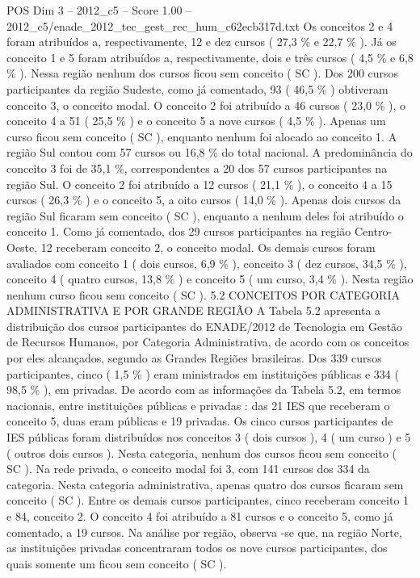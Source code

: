\begin{textsample}{POS Dim 3 – 2012\_c5 – Score 1.00 – 2012\_c5/enade\_2012\_tec\_gest\_rec\_hum\_c62ecb317d.txt}
Os conceitos 2 e 4 foram atribuídos a, respectivamente, 12 e dez cursos ( 27,3 \% e 22,7 \% ).
Já os conceito 1 e 5 foram atribuídos a, respectivamente, dois e três cursos ( 4,5 \% e 6,8 \% ).
Nessa região nenhum dos cursos ficou sem conceito ( SC ).
Dos 200 cursos participantes da região Sudeste, como já comentado, 93 ( 46,5 \% ) obtiveram conceito 3, o conceito modal.
O conceito 2 foi atribuído a 46 cursos ( 23,0 \% ), o conceito 4 a 51 ( 25,5 \% ) e o conceito 5 a nove cursos ( 4,5 \% ).
Apenas um curso ficou sem conceito ( SC ), enquanto nenhum foi alocado ao conceito 1.
A região Sul contou com 57 cursos ou 16,8 \% do total nacional.
A predominância do conceito 3 foi de 35,1 \%, correspondentes a 20 dos 57 cursos participantes na região Sul.
O conceito 2 foi atribuído a 12 cursos ( 21,1 \% ), o conceito 4 a 15 cursos ( 26,3 \% ) e o conceito 5, a oito cursos ( 14,0 \% ).
Apenas dois cursos da região Sul ficaram sem conceito ( SC ), enquanto a nenhum deles foi atribuído o conceito 1.
Como já comentado, dos 29 cursos participantes na região Centro-Oeste, 12 receberam conceito 2, o conceito modal.
Os demais cursos foram avaliados com conceito 1 ( dois cursos, 6,9 \% ), conceito 3 ( dez cursos, 34,5 \% ), conceito 4 ( quatro cursos, 13,8 \% ) e conceito 5 ( um curso, 3,4 \% ).
Nesta região nenhum curso ficou sem conceito ( SC ). 5.2 CONCEITOS POR CATEGORIA ADMINISTRATIVA E POR GRANDE REGIÃO A Tabela 5.2 apresenta a distribuição dos cursos participantes do ENADE/2012 de Tecnologia em Gestão de Recursos Humanos, por Categoria Administrativa, de acordo com os conceitos por eles alcançados, segundo as Grandes Regiões brasileiras.
Dos 339 cursos participantes, cinco ( 1,5 \% ) eram ministrados em instituições públicas e 334 ( 98,5 \% ), em privadas.
De acordo com as informações da Tabela 5.2, em termos nacionais, entre instituições públicas e privadas : das 21 IES que receberam o conceito 5, duas eram públicas e 19 privadas.
Os cinco cursos participantes de IES públicas foram distribuídos nos conceitos 3 ( dois cursos ), 4 ( um curso ) e 5 ( outros dois cursos ).
Nesta categoria, nenhum dos cursos ficou sem conceito ( SC ).
Na rede privada, o conceito modal foi 3, com 141 cursos dos 334 da categoria.
Nesta categoria administrativa, apenas quatro dos cursos ficaram sem conceito ( SC ).
Entre os demais cursos participantes, cinco receberam conceito 1 e 84, conceito 2.
O conceito 4 foi atribuído a 81 cursos e o conceito 5, como já comentado, a 19 cursos.
Na análise por região, observa -se que, na região Norte, as instituições privadas concentraram todos os nove cursos participantes, dos quais somente um ficou sem conceito ( SC ).

\end{textsample}
